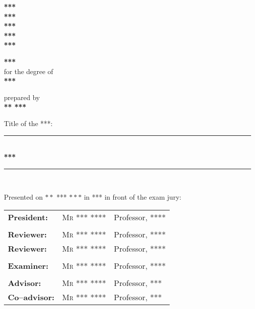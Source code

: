 \begin{titlepage}
\newcommand{\HRule}{\rule{\linewidth}{0.35mm}} %
\begin{flushleft}
{\scriptsize
\textbf{\large{***}}\\
\textbf{\large{***}}\\
\textbf{\large{***}}\\
\textbf{\large{***}}\\
\textbf{\large{***}}}
\end{flushleft}
\begin{center}
\textbf{\textsc{\huge{***}}}\\
for the degree of\\
\textbf{\textsc{\large{***}}}\\
\end{center}
\begin{center}
prepared by\\
\textbf{{\large *** \textsc{***}}}\\
\end{center}
\begin{center}
Title of the ***:\\
\HRule \\[0.3cm]
\Huge{\textbf{***}}\\[0.2cm]
\HRule \\%
\end{center}
\begin{center}
Presented on $**$ *** $***$ in *** in front of the exam jury:\\
\end{center}
\begin{center}
\begin{tabular}{lll}
\textbf{President:} & \textsc{Mr *** ****} & Professor, \textsc{****}
\tabularnewline
\tabularnewline
\textbf{Reviewer:} & \textsc{Mr *** ****} & Professor, \textsc{****}
\tabularnewline
\textbf{Reviewer:} & \textsc{Mr *** ****} & Professor, \textsc{****} 
\tabularnewline
\tabularnewline
\textbf{Examiner:} & \textsc{Mr *** ****} & Professor, \textsc{****}
\tabularnewline
\tabularnewline
\textbf{Advisor:} & \textsc{Mr *** ****} & Professor, \textsc{***}
\tabularnewline
\textbf{Co--advisor:} & \textsc{Mr *** ****} & Professor, \textsc{***}
\end{tabular}
\end{center}
\sloppy
\end{titlepage}
